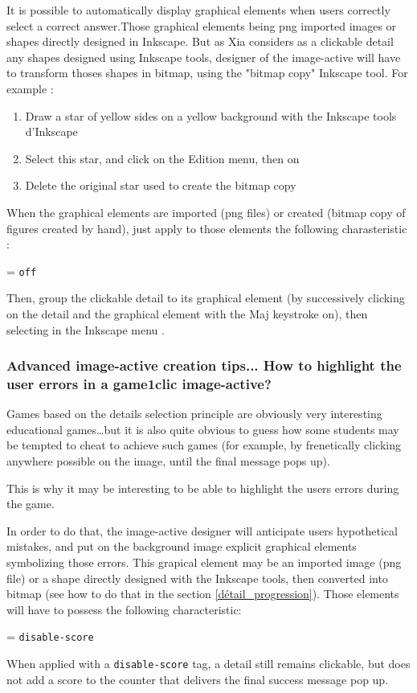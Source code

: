 It is possible to automatically display graphical elements when users correctly 
select a correct answer.Those graphical elements being png imported images or 
shapes directly designed in Inkscape. But as Xia considers as a clickable 
detail any shapes designed using Inkscape tools, designer of the image-active 
will have to transform thoses shapes in bitmap, using the "bitmap copy" Inkscape tool. 
For example :
\begin{enumerate}
 \item Draw  a star of yellow sides on a yellow background with the  Inkscape tools 
d'Inkscape
 \item Select this star, and click on \chemin
the {Edition} menu, then on 
 \item Delete the original star used to create the bitmap copy
\end{enumerate}

When the graphical elements are imported (png files) or created (bitmap copy 
of figures created by hand), just apply to those elements the following 
charasteristic :
\begin{center}
 = \verb|off|
\end{center}
Then, group the clickable detail to its graphical element (by successively 
clicking on the detail and the graphical element with the Maj keystroke on),
then selecting  in the Inkscape menu .

\subsubsection{Advanced image-active creation tips... How to highlight the user errors in a game1clic image-active?}

Games based on the details selection principle are obviously very
interesting educational games\ldots but it is also quite obvious to guess how some students may be tempted to cheat to achieve such games (for example, by 
frenetically clicking anywhere possible on the image, until the final message pops up).

This is why it may be interesting to be able to 
highlight the users errors during the game.

In order to do that, the image-active designer will anticipate users hypothetical mistakes, and 
put on the background image explicit graphical elements symbolizing those errors. 
This grapical element may be an imported image 
(png file) or a shape directly designed with the Inkscape tools, 
then converted into bitmap (see how to do that in the section 
\ref{détail_progression}). Those elements will have to possess the following characteristic:
\begin{center}
 = \verb|disable-score| 
\end{center}
When applied with a \verb|disable-score| tag, a detail still remains clickable, but does not 
add a score to the counter that delivers the final success message pop up.

